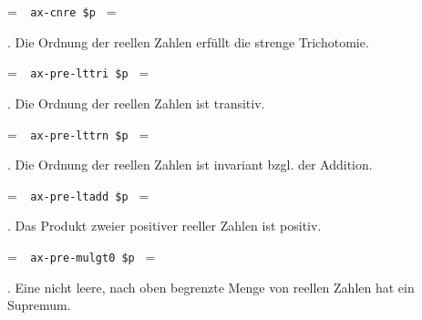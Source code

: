 \setbox\startprefix=\hbox{\tt \ \ ax-cnre\ \$p\ }
\setbox\contprefix=\hbox{\tt \ \ \ \ \ \ \ \ \ \ \ \ }
\startm
\m{\vdash}\m{(}\m{\in}\m{\rightarrow}\m{\exists}\m{\in}%
\m{\exists}\m{\in}\m{=}\m{(}\m{+}\m{(}%
\m{\cdot}\m{)}\m{)}\m{)}
\endm

. Die Ordnung der reellen Zahlen erfüllt die strenge Trichotomie.

\setbox\startprefix=\hbox{\tt \ \ ax-pre-lttri\ \$p\ }
\setbox\contprefix=\hbox{\tt \ \ \ \ \ \ \ \ \ \ \ \ \ }
\startm
\m{\vdash}\m{(}\m{(}\m{\in}\m{\wedge}\m{\in}%
\m{)}\m{\rightarrow}\m{(}\m{<}\m{\leftrightarrow}\m{\lnot}\m{(}%
\m{=}\m{\vee}\m{<}\m{)}\m{)}\m{)}
\endm

. Die Ordnung der reellen Zahlen ist transitiv.

\setbox\startprefix=\hbox{\tt \ \ ax-pre-lttrn\ \$p\ }
\setbox\contprefix=\hbox{\tt \ \ \ \ \ \ \ \ \ \ \ \ \ }
\startm
\m{\vdash}\m{(}\m{(}\m{\in}\m{\wedge}\m{\in}%
\m{\wedge}\m{\in}\m{)}\m{\rightarrow}\m{(}\m{(}\m{<}%
\m{\wedge}\m{<}\m{)}\m{\rightarrow}\m{<}\m{)}\m{)}
\endm

. Die Ordnung der reellen Zahlen ist invariant bzgl. der Addition.

\setbox\startprefix=\hbox{\tt \ \ ax-pre-ltadd\ \$p\ }
\setbox\contprefix=\hbox{\tt \ \ \ \ \ \ \ \ \ \ \ \ \ }
\startm
\m{\vdash}\m{(}\m{(}\m{\in}\m{\wedge}\m{\in}%
\m{\wedge}\m{\in}\m{)}\m{\rightarrow}\m{(}\m{<}\m{%
\rightarrow}\m{(}\m{+}\m{)}\m{<}\m{(}\m{+}\m{)}\m{)}\m{)}
\endm

. Das Produkt zweier positiver reeller Zahlen ist positiv.

\setbox\startprefix=\hbox{\tt \ \ ax-pre-mulgt0\ \$p\ }
\setbox\contprefix=\hbox{\tt \ \ \ \ \ \ \ \ \ \ \ \ \ \ }
\startm
\m{\vdash}\m{(}\m{(}\m{\in}\m{\wedge}\m{\in}%
\m{)}\m{\rightarrow}\m{(}\m{(}\m{<}\m{\wedge}%
\m{<}\m{)}\m{\rightarrow}\m{<}\m{(}\m{\cdot}\m{)}%
\m{)}\m{)}
\endm

. Eine nicht leere, nach oben begrenzte Menge von reellen Zahlen hat ein Supremum.

